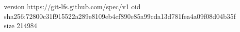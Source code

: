 version https://git-lfs.github.com/spec/v1
oid sha256:72800c31f915522a289e8109eb4cf890e85a99cda13d781fea4a09f08d04b35f
size 214984
